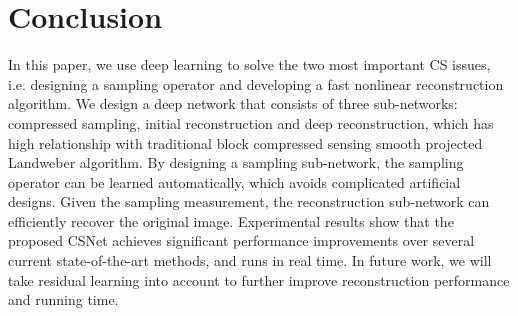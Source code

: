 \documentclass[5pt]{article}
\begin{document}
\section{Conclusion}

In this paper, we use deep learning to solve the two most important CS issues, i.e. designing a sampling operator and developing a fast nonlinear reconstruction algorithm. We design a deep network that consists of three sub-networks: compressed sampling, initial reconstruction and deep reconstruction, which has high relationship with traditional block compressed sensing smooth projected Landweber algorithm. By designing a sampling sub-network, the sampling operator can be learned automatically, which avoids complicated artificial designs. Given the sampling measurement, the reconstruction sub-network can efficiently recover the original image. Experimental results show that the proposed CSNet achieves significant performance improvements over several current state-of-the-art methods, and runs in real time. In future work, we will take residual learning into account to further improve reconstruction performance and running time.


\scriptsize
\setlength{\bibsep}{0.9ex}

\end{document}
